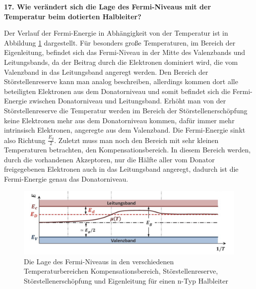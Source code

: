\noindent\textbf{17. Wie verändert sich die Lage des Fermi-Niveaus mit der Temperatur beim dotierten Halbleiter?}\\
\begin{addmargin}[25pt]{0pt}
Der Verlauf der Fermi-Energie in Abhängigkeit von der Temperatur ist in Abbildung \ref{fig:Fermi_Energie_dotiert_Temperatur} dargestellt. Für besonders große Temperaturen, im Bereich der Eigenleitung, befindet sich das Fermi-Niveau in der Mitte des Valenzbands und Leitungsbands, da der Beitrag durch die Elektronen dominiert wird, die vom Valenzband in das Leitungsband angeregt werden. Den Bereich der Störstellenreserve kann man analog beschreiben, allerdings kommen dort alle beteiligten Elektronen aus dem Donatorniveau und somit befindet sich die Fermi-Energie zwischen Donatorniveau und Leitungsband. Erhöht man von der Störstellenreserve die Temperatur werden im Bereich der Störstellenerschöpfung keine Elektronen mehr aus dem Donatorniveau kommen, dafür immer mehr intrinsisch Elektronen, angeregte aus dem Valenzband. Die Fermi-Energie sinkt also Richtung $\frac{E_g}{2}$. Zuletzt muss man noch den Bereich mit sehr kleinen Temperaturen betrachten, den Kompensationsbereich. In diesem Bereich werden, durch die vorhandenen Akzeptoren, nur die Hälfte aller vom Donator freigegebenen Elektronen auch in das Leitungsband angeregt, dadurch ist die Fermi-Energie genau das Donatorniveau.\\ 
\begin{figure}[h]
    \centering
    \includegraphics[width = \textwidth]{images/KM2/Fermi_Niveau_Temperatur_dotiert.jpeg}
    \caption{Die Lage des Fermi-Niveaus in den verschiedenen Temperaturbereichen Kompensationsbereich, Störstellenreserve, Störstellenerschöpfung und Eigenleitung für einen n-Typ Halbleiter}
    \label{fig:Fermi_Energie_dotiert_Temperatur}
\end{figure}
\end{addmargin}

